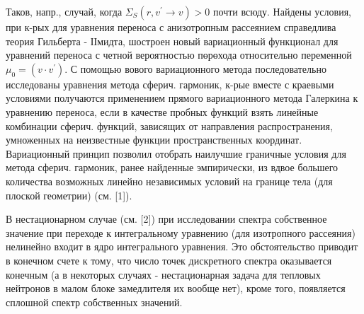 \documentclass[10pt]{article}
\begin{document}
Таков, напр., случай, когда $\Sigma_{S}\left(r, v^{\prime} \rightarrow v\right)>0$ почти всюду. Найдены условия, при к-рых для уравнения переноса с анизотропным рассеянием справедлива теория Гильберта - ІІмидта, шостроен новый вариационный функционал для уравнений переноса с четной вероятностью пөрөхода относительно переменной $\mu_{0}=\left(v \cdot v^{\prime}\right)$. С помощью вового вариационного метода последовательно исследованы уравнения метода сферич. гармоник, к-рые вместе с краевыми условиями получаются применением прямого вариационного метода Галеркина к уравнению переноса, если в качестве пробных функций взять линейные комбинации сферич. функций, зависящих от направления распространения, умноженных на неизвестные функции пространственных координат. Вариационный принцип позволил отобрать наилучшие граничные условия для метода сферич. гармоник, ранее найденные эмпирически, из вдвое большего количества возможных линейно независимых условий на границе тела (для плоской геометрии) (см. [1]).

В нестационарном случае (см. [2]) при исследовании спектра собственное значение при переходе к интегральному уравнению (для изотропного рассеяния) нелинейно входит в ядро интегрального уравнения. Это обстоятельство приводит в конечном счете к тому, что число точек дискретного спектра оказывается конечным (а в некоторых случаях - нестационарная задача для тепловых нейтронов в малом блоке замедлителя их вообще нет), кроме того, появляется сплошной спектр собственных значений.
\end{document}
